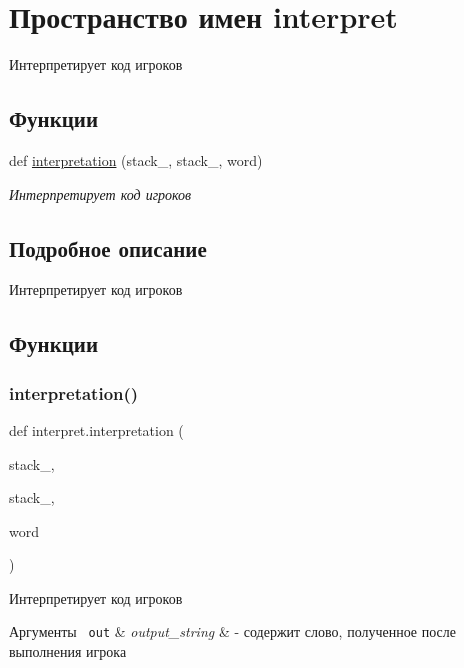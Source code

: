 \hypertarget{namespaceinterpret}{}\section{Пространство имен interpret}
\label{namespaceinterpret}


Интерпретирует код игроков  


\subsection*{Функции}
\begin{DoxyCompactItemize}
\item 
def \mbox{\hyperlink{namespaceinterpret_a8b884e5558d7091eb3365147074d5c1a}{interpretation}} (stack\+\_, stack\+\_, word)
\begin{DoxyCompactList}\small\item\em Интерпретирует код игроков \end{DoxyCompactList}\end{DoxyCompactItemize}


\subsection{Подробное описание}
Интерпретирует код игроков 

\subsection{Функции}
\mbox{\label{namespaceinterpret_a8b884e5558d7091eb3365147074d5c1a}} 
\subsubsection{\texorpdfstring{interpretation()}{interpretation()}}
{\footnotesize\ttfamily def interpret.\+interpretation (\begin{DoxyParamCaption}\item[{}]{stack\+\_,  }\item[{}]{stack\+\_,  }\item[{}]{word }\end{DoxyParamCaption})}



Интерпретирует код игроков 


\begin{DoxyParams}[1]{Аргументы}
\mbox{\texttt{ out}}  & {\em output\+\_\+string} & -\/ содержит слово, полученное после выполнения игрока \\
\hline
\end{DoxyParams}
